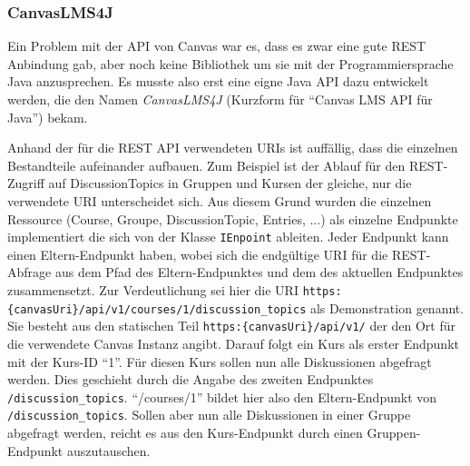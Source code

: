 
\subsubsection{CanvasLMS4J} %
\label{ssub:canvaslms4j}

Ein Problem mit der API von Canvas war es, dass es zwar eine gute REST Anbindung gab, aber noch keine Bibliothek um sie mit der Programmiersprache Java anzusprechen. Es musste also erst eine eigne Java API dazu entwickelt werden, die den Namen \emph{CanvasLMS4J} (Kurzform für \enquote{Canvas LMS API für Java}) bekam. 

Anhand der für die REST API verwendeten URIs ist auffällig, dass die einzelnen Bestandteile aufeinander aufbauen. Zum Beispiel ist der Ablauf für den REST-Zugriff auf DiscussionTopics in Gruppen und Kursen der gleiche, nur die verwendete URI unterscheidet sich. Aus diesem Grund wurden die einzelnen Ressource (Course, Groupe, DiscussionTopic, Entries, ...) als einzelne Endpunkte implementiert die sich von der Klasse \texttt{IEnpoint} ableiten. Jeder Endpunkt kann einen Eltern-Endpunkt haben, wobei sich die endgültige URI für die REST-Abfrage aus dem Pfad des Eltern-Endpunktes und dem des aktuellen Endpunktes zusammensetzt. Zur Verdeutlichung sei hier die URI \texttt{https:\{canvasUri\}/api/v1/courses/1/discussion\_topics} als Demonstration genannt. Sie besteht aus den statischen Teil \texttt{https:\{canvasUri\}/api/v1/} der den Ort für die verwendete Canvas Instanz angibt. Darauf folgt ein Kurs als erster Endpunkt mit der Kurs-ID \enquote{1}. Für diesen Kurs sollen nun alle Diskussionen abgefragt werden. Dies geschieht durch die Angabe des zweiten Endpunktes \texttt{/discussion\_topics}. \enquote{/courses/1} bildet hier also den Eltern-Endpunkt von \texttt{/discussion\_topics}. Sollen aber nun alle Diskussionen in einer Gruppe abgefragt werden, reicht es aus den Kurs-Endpunkt durch einen Gruppen-Endpunkt auszutauschen.

